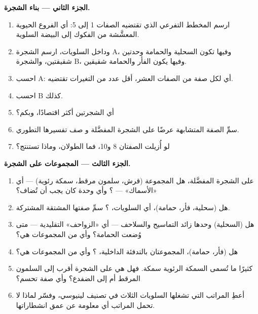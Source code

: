\begin{problem}
\medskip
\noindent\textbf{الجزء الثاني --- بناء الشجرة.}
\begin{enumerate}[resume]
  \item ارسم المخطط التفرعي الذي تقتضيه الصفات 1 إلى 5: أي
        الفروع الحيوية المعشَّشة من الفكوك إلى البيضة السلوية.
  \item وداخل السلويات، ارسم الشجرة A، وفيها تكون السحلية
        والحمامة وحدتين شقيقتين، والشجرة B، وفيها يكون الفأر
        والحمامة شقيقين.
  \item احسب  A: أي لكل صفة من الصفات العشر،
        أقل عدد من التغيرات تقتضيه.
  \item احسب  B كذلك.
  \item أي الشجرتين أكثر اقتصادًا، وبكم؟
  \item سمِّ الصفة المتشابهة عرضًا على الشجرة المفضَّلة و
        صف تفسيرها التطوري.
  \item لو أُزيلت الصفتان 8 و10، فما الطولان، وماذا
        تستنتج؟
\end{enumerate}

\medskip
\noindent\textbf{الجزء الثالث --- المجموعات على الشجرة.}
\begin{enumerate}[resume]
  \item على الشجرة المفضَّلة، هل المجموعة (قرش، سلمون مرقط، سمكة رئوية)
        --- أي «الأسماك» --- ؟ وأي وحدة كان يجب أن
        تُضاف؟
  \item هل (سحلية، فأر، حمامة)، أي السلويات، ؟ سمِّ
        صفتها المشتقة المشتركة.
  \item هل (السحلية) وحدها زائد التماسيح والسلاحف --- أي «الزواحف»
        التقليدية ---  متى وُضعت الحمامة؟ وأي 
        من المجموعات هي؟
  \item هل (فأر، حمامة)، المجموعتان بالتدفئة الداخلية، ؟ وأي 
        من المجموعات هي؟
  \item كثيرًا ما تُسمى السمكة الرئوية سمكة. فهل هي على الشجرة أقرب
        إلى السلمون المرقط أم إلى الضفدع؟ وأي صفة تحسم؟
  \item أعطِ المراتب التي تشغلها السلويات الثلاث في تصنيف
        لينيوسي، وفسّر لماذا لا تحمل المراتب أي معلومة
        عن عمق انشطاراتها.
\end{enumerate}


\end{problem}
